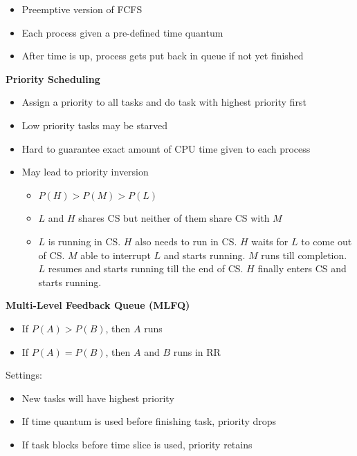 \documentclass[a4paper, 12pt]{article}
\begin{document}
\begin{multicols*}{3}
\begin{itemize}
	\item Preemptive version of FCFS
	\item Each process given a pre-defined time quantum
	\item After time is up, process gets put back in queue if not yet finished
\end{itemize}
\textbf{Priority Scheduling}
\begin{itemize}
	\item Assign a priority to all tasks and do task with highest priority first
	\item Low priority tasks may be starved
	\item Hard to guarantee exact amount of CPU time given to each process
	\item May lead to priority inversion
	\begin{itemize}
		\item $P(H) > P(M) > P(L)$
		\item $L$ and $H$ shares CS but neither of them share CS with $M$
		\item $L$ is running in CS. $H$ also needs to run in CS. $H$ waits for $L$ to come out of CS. $M$ able to interrupt $L$ and starts running. $M$ runs till completion. $L$ resumes and starts running till the end of CS. $H$ finally enters CS and starts running.
	\end{itemize}
\end{itemize}
\textbf{Multi-Level Feedback Queue (MLFQ)}
\begin{itemize}
	\item If $P(A) > P(B)$, then $A$ runs
	\item If $P(A) = P(B)$, then $A$ and $B$ runs in RR
\end{itemize}
Settings:
\begin{itemize}
	\item New tasks will have highest priority
	\item If time quantum is used before finishing task, priority drops
	\item If task blocks before time slice is used, priority retains
\end{itemize}

\medskip


\end{multicols*}
\end{document}

